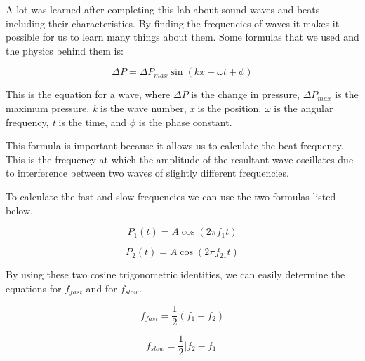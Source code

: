

{A lot was learned after completing this lab about sound waves and beats including their characteristics. By finding the frequencies of waves it makes it possible for us to learn many things about them. Some formulas that we used and the physics behind them is:}

	$$\Delta P = \Delta P_{max}\sin\left(kx - \omega t + \phi\right)$$

{This is the equation for a wave, where $\Delta P$ is the change in pressure, $\Delta P_{max}$ is the maximum pressure, \textit{k} is the wave number, \textit{x} is the position, $\omega$ is the angular frequency, \textit{t} is the time, and $\phi$ is the phase constant.}

{This formula is important because it allows us to calculate the beat frequency. This is the frequency at which the amplitude of the resultant wave oscillates due to interference between two waves of slightly different frequencies.}

{To calculate the fast and slow frequencies we can use the two formulas listed below.}

	$$P_{1}\left(t\right) = A\cos\left(2\pi f_{1}t\right)$$
	
	$$P_{2}\left(t\right) = A\cos\left(2\pi f_{21}t\right)$$
	
{By using these two cosine trigonometric identities, we can easily determine the equations for $f_{fast}$ and for $f_{slow}$.}

	$$f_{fast} = \frac{1}{2}\left(f_{1} + f_{2}\right)$$
	
	$$f_{slow} = \frac{1}{2}\left|f_{2} - f_{1}\right|$$

